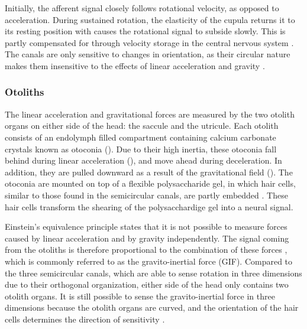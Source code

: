 Initially, the afferent signal closely follows rotational velocity, as opposed to acceleration. During sustained rotation, the elasticity of the cupula returns it to its resting position with causes the rotational signal to subside slowly. This is partly compensated for through velocity storage in the central nervous system \cite{goldberg2012}. The canals are only sensitive to changes in orientation, as their circular nature makes them insensitive to the effects of linear acceleration and gravity \cite{goldberg2012}.


\subsubsection{Otoliths}
The linear acceleration and gravitational forces are measured by the two otolith organs on either side of the head: the saccule and the utricule. Each otolith consists of an endolymph filled compartment containing calcium carbonate crystals known as otoconia (). Due to their high inertia, these otoconia fall behind during linear acceleration (), and move ahead during deceleration. In addition, they are pulled downward as a result of the gravitational field (). The otoconia are mounted on top of a flexible polysaccharide gel, in which hair cells, similar to those found in the semicircular canals, are partly embedded \cite{goldberg2012}. These hair cells transform the shearing of the polysacchardige gel into a neural signal.

Einstein's equivalence principle states that  it is not possible to measure forces caused by linear acceleration and by gravity independently. The signal coming from the otoliths is therefore proportional to the combination of these forces \cite{fernandez1976b}, which is commonly referred to as the gravito-inertial force (GIF). Compared to the three semicircular canals, which are able to sense rotation in three dimensions due to their orthogonal organization, either side of the head only contains two otolith organs. It is still possible to sense the gravito-inertial force in three dimensions because the otolith organs are curved, and the orientation of the hair cells determines the direction of sensitivity \cite{goldberg2012}.

